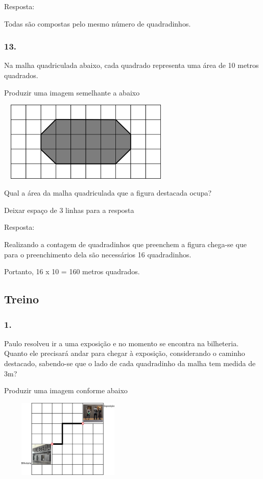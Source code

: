 Resposta:

Todas são compostas pelo mesmo número de quadradinhos.

\subsubsection{13.}\label{section-76}

Na malha quadriculada abaixo, cada quadrado representa uma área de 10
metros quadrados.

Produzir uma imagem semelhante a abaixo

\includegraphics[width=3.33333in,height=1.50517in]{media/image60.png}

Qual a área da malha quadriculada que a figura destacada ocupa?

Deixar espaço de 3 linhas para a resposta

Resposta:

Realizando a contagem de quadradinhos que preenchem a figura chega-se
que para o preenchimento dela são necessários 16 quadradinhos.

Portanto, 16 x 10 = 160 metros quadrados.

\subsection{Treino}\label{treino-4}

\subsubsection{1.}\label{section-77}

Paulo resolveu ir a uma exposição e no momento se encontra na
bilheteria. Quanto ele precisará andar para chegar à exposição,
considerando o caminho destacado, sabendo-se que o lado de cada
quadradinho da malha tem medida de 3m?

Produzir uma imagem conforme abaixo

\includegraphics[width=2.60897in,height=1.46587in]{media/image61.png}

